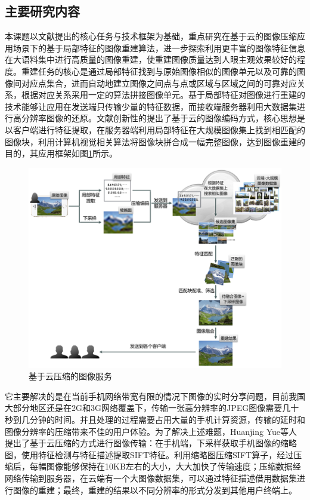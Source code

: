 \subsection{主要研究内容}

本课题以文献\cite{Yue:2013gl}提出的核心任务与技术框架为基础，重点研究在基于云的图像压缩应用场景下的基于局部特征的图像重建算法，进一步探索利用更丰富的图像特征信息在大语料集中进行高质量的图像重建，使重建图像质量达到人眼主观效果较好的程度。重建任务的核心是通过局部特征找到与原始图像相似的图像单元以及可靠的图像间对应点集合，进而自动地建立图像之间点与点或区域与区域之间的可靠对应关系，根据对应关系采用一定的算法拼接图像单元。基于局部特征对图像进行重建的技术能够让应用在发送端只传输少量的特征数据，而接收端服务器利用大数据集进行高分辨率图像的还原。文献\cite{Yue:2013gl}创新性的提出了基于云的图像编码方式，核心思想是以客户端进行特征提取，在服务器端利用局部特征在大规模图像集上找到相匹配的图像块，利用计算机视觉相关算法将图像块拼合成一幅完整图像，达到图像重建的目的，其应用框架如图\ref{fig:service}所示。

\begin{figure}
\centering\includegraphics[width=15cm]{imgs/ch1/super_overview}
\caption{基于云压缩的图像服务}
\label{fig:service}
\end{figure}

它主要解决的是在当前手机网络带宽有限的情况下图像的实时分享问题，目前我国大部分地区还是在2G和3G网络覆盖下，传输一张高分辨率的JPEG图像需要几十秒到几分钟的时间。并且处理的过程需要占用大量的手机计算资源，传输的延时和图像分辨率的压缩带来不佳的用户体验。为了解决上述难题，Huanjing Yue等人提出了基于云压缩的方式进行图像传输：在手机端，下采样获取手机图像的缩略图，使用特征检测与特征描述提取SIFT特征。利用缩略图压缩SIFT算子，经过压缩后，每幅图像能够保持在10KB左右的大小，大大加快了传输速度；压缩数据经网络传输到服务器，在云端有一个大图像数据集，可以通过特征描述借用数据集进行图像的重建；最终，重建的结果以不同分辨率的形式分发到其他用户终端上。

